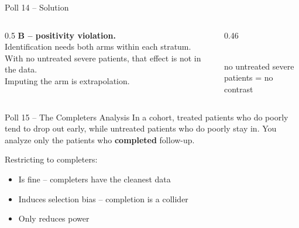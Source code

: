 \documentclass[aspectratio=169]{beamer}
\begin{document}
\begin{frame}{Poll 14 \;--\; Solution}
  \small
  \begin{columns}[T]
    \begin{column}{0.5\textwidth}
      \textcolor{good}{\textbf{B -- positivity violation.}}\\[0.4em]
      Identification needs both arms within each stratum. With no untreated
      severe patients, that effect is not in the data.\\[0.2em]
      \textcolor{brick}{Imputing the arm is extrapolation.}
    \end{column}
    \begin{column}{0.46\textwidth}
      \centering
      \\[0.3em]
      {\scriptsize no untreated severe patients = no contrast}
    \end{column}
  \end{columns}
\end{frame}

\begin{frame}{Poll 15 \;--\; The Completers Analysis}
  \small
  In a cohort, treated patients who do poorly tend to drop out early, while
  untreated patients who do poorly stay in. You analyze only the patients who
  \textbf{completed} follow-up.
  \vspace{0.8em}

  Restricting to completers:
  \begin{itemize}
    \item[\textbf{A.}] Is fine -- completers have the cleanest data
    \item[\textbf{B.}] Induces selection bias -- completion is a collider
    \item[\textbf{C.}] Only reduces power
  \end{itemize}
\end{frame}
\end{document}
